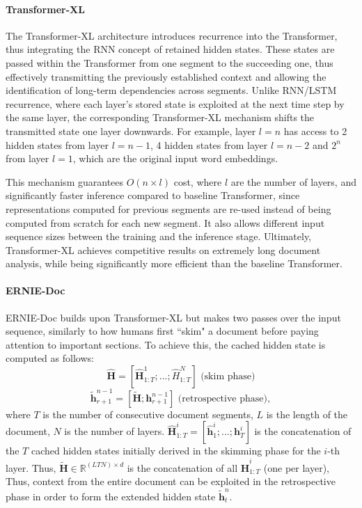 \documentclass[preprint,review,10pt]{elsarticle}
\begin{document}
	\paragraph{Transformer-XL} The Transformer-XL architecture \cite{dai-etal-2019-transformer} introduces recurrence into the Transformer, thus integrating the RNN concept of retained hidden states. These states are passed within the Transformer from one segment to the succeeding one, thus effectively transmitting the previously established context and allowing the identification of long-term dependencies across segments. Unlike RNN/LSTM recurrence, where each layer's stored state is exploited at the next time step by the same layer, the corresponding Transformer-XL mechanism shifts the transmitted state one layer downwards. For example, layer $l=n$ has access to 2 hidden states from layer $l=n-1$, 4 hidden states from layer $l=n-2$ and $2^n$ from layer $l=1$, which are the original input word embeddings.
	
	This mechanism guarantees $O(n \times l)$ cost, where $l$ are the number of layers, and significantly faster inference compared to baseline Transformer, since representations computed for previous segments are re-used instead of being computed from scratch for each new segment. It also allows different input sequence sizes between the training and the inference stage. Ultimately, Transformer-XL achieves competitive results on extremely long document analysis, while being significantly more efficient than the baseline Transformer.
	
	\paragraph{ERNIE-Doc} ERNIE-Doc \cite{ernie-doc} builds upon Transformer-XL but makes two passes over the input sequence, similarly to how humans first ``skim" a document before paying attention to important sections. To achieve this, the cached hidden state is computed as follows:
	\begin{equation}
		\hat{\mathbf{H}} = [\hat{\mathbf{H}}^{1}_{1:T};...;\hat{H}^{N}_{1:T}] \text{ (skim phase)}
	\end{equation}
	\begin{equation}
		\tilde{\mathbf{h}}_{r+1}^{n-1} = [\tilde{\mathbf{H}};\mathbf{h}_{r+1}^{n-1}] \text{ (retrospective phase)},
	\end{equation}
	\noindent where $T$ is the number of consecutive document segments, $L$ is the length of the document, $N$ is the number of layers. $\hat{\mathbf{H}}^{i}_{1:T} = [\hat{\mathbf{h}}^{i}_1;...;{\mathbf{h}}^{i}_T]$ is the concatenation of the $T$ cached hidden states initially derived in the skimming phase for the $i$-th layer. Thus, $\tilde{\mathbf{H}} \in \mathbb{R}^{(LTN) \times d}$ is the concatenation of all $\hat{\mathbf{H}}^{i}_{1:T}$ (one per layer), Thus, context from the entire document can be exploited in the retrospective phase in order to form the extended hidden state $\tilde{\mathbf{h}}^{n}_t$.
	
\end{document}

